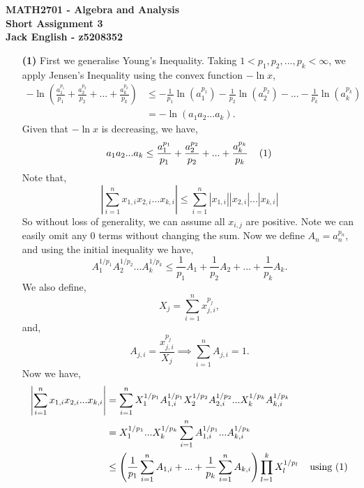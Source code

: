 \documentclass[a4paper]{article}
\begin{document}
\begin{center}
  \vspace{-3mm}
	\textbf{\large {MATH2701 - Algebra and Analysis \\
	Short Assignment 3 \\
	Jack English - z5208352}}
\end{center}
\vspace{-5mm}

\begin{enumerate}[leftmargin=\labelsep]
	\item[\textbf{(1)}]
		First we generalise Young's Inequality. Taking $1 < p_1, p_2, ... , p_k < \infty$, we apply Jensen's Inequality using the convex function $-\ln{x}$,
		\begin{align*}
			-\ln\left(\frac{a_1^{p_1}}{p_1} + \frac{a_2^{p_2}}{p_2} + ... + \frac{a_k^{p_k}}{p_k}\right) & \leq -\frac{1}{p_1}\ln\left(a_1^{p_1}\right) -\frac{1}{p_2}\ln\left(a_2^{p_2}\right) -...- \frac{1}{p_k}\ln\left(a_k^{p_k}\right) \\
			& = -\ln(a_1a_2 ... a_k).
		\end{align*}
		Given that $-\ln{x}$ is decreasing, we have,
		$$a_1a_2 ... a_k \leq \frac{a_1^{p_1}}{p_1} + \frac{a_2^{p_2}}{p_2} + ... + \frac{a_k^{p_k}}{p_k} \hspace{4mm} (1)$$
		Note that,
		$$\left|\sum_{i = 1}^n x_{1,i}x_{2,i} ... x_{k,i}\right| \leq \sum_{i = 1}^n |x_{1,i}||x_{2,i}|...|x_{k,i}|$$
		So without loss of generality, we can assume all $x_{i,j}$ are positive. Note we can easily omit any 0 terms without changing the sum.
		Now we define $A_n = a_n^{p_n}$, and using the initial inequality we have,
		$$A_1^{1 / p_1}A_2^{1 / p_2} ... A_k^{1 / p_k} \leq \frac{1}{p_1}A_1 + \frac{1}{p_2}A_2 + ... + \frac{1}{p_k}A_k.$$
		We also define,
		$$X_j = \sum_{i = 1}^n x_{j,i}^{p_j},$$
		and,
		$$A_{j,i} = \frac{x_{j,i}^{p_j}}{X_j} \implies \sum_{i = 1}^n A_{j,i} = 1.$$
		Now we have,
		\begin{align*}
			\left|\sum_{i = 1}^n x_{1,i}x_{2,i}...x_{k,i}\right| & = \sum_{i = 1}^n X_1^{1 / p_1}A_{1,i}^{1 / p_1} X_2^{1 / p_2}A_{2,i}^{1 / p_2}... X_k^{1 / p_k}A_{k,i}^{1 / p_k} \\
			& = X_1^{1 / p_1}...X_k^{1 / p_k}\sum_{i = 1}^n A_{1,i}^{1 / p_1} ...A_{k,i}^{1 / p_k}  \\
			& \leq \left(\frac{1}{p_1} \sum_{i = 1}^n A_{1,i} + ... + \frac{1}{p_k} \sum_{i = 1}^n A_{k,i} \right) \prod_{l = 1}^k X_l^{1 / p_l} \hspace{4mm} \text{using } (1) \\

\end{align*}
\end{enumerate}
\end{document}

